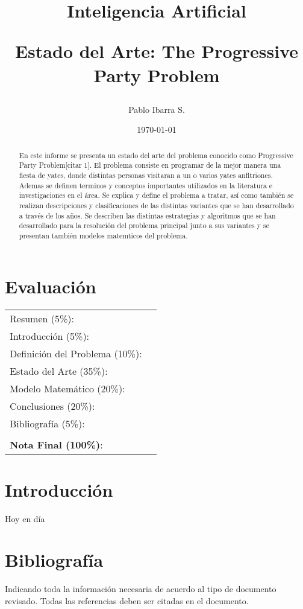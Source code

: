 \documentclass[spanish, fleqn]{article}
\begin{document}
\title{Inteligencia Artificial \\ \begin{Large}Estado del Arte: The Progressive Party Problem\end{Large}}
\author{Pablo Ibarra S.}
\date{\today}
\maketitle

\section*{Evaluación}

\begin{tabular}{ll}
Resumen (5\%): & \underline{\hspace{2cm}} \\
Introducción (5\%):  & \underline{\hspace{2cm}} \\
Definición del Problema (10\%):  & \underline{\hspace{2cm}} \\
Estado del Arte (35\%):  & \underline{\hspace{2cm}} \\
Modelo Matemático (20\%): &  \underline{\hspace{2cm}}\\
Conclusiones (20\%): &  \underline{\hspace{2cm}}\\
Bibliografía (5\%): & \underline{\hspace{2cm}}\\
 &  \\
\textbf{Nota Final (100\%)}:   & \underline{\hspace{2cm}}
\end{tabular}

\begin{abstract}
En este informe se presenta un estado del arte del problema conocido como Progressive Party Problem[citar 1]. El problema consiste en programar de la mejor manera una fiesta de yates, donde distintas personas visitaran a un o varios yates anfitriones. Ademas se definen terminos y conceptos importantes utilizados en la literatura e investigaciones en el área. Se explica y define el problema a tratar, así como también se realizan descripciones y clasificaciones de las distintas variantes que se han desarrollado a través de los años. Se describen las distintas estrategias y algoritmos que se han desarrollado para la resolución del problema principal junto a sus variantes y se presentan también modelos matemticos del problema.
\end{abstract}

\section{Introducción}

Hoy en día 

\section{Bibliograf\'ia}
Indicando toda la informaci\'on necesaria de acuerdo al tipo de documento revisado. Todas las referencias deben ser citadas en el documento.


\end{document}
